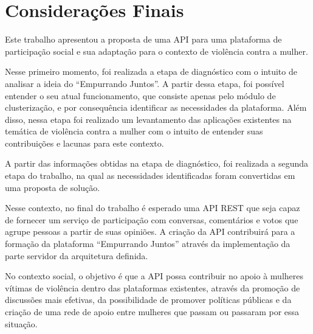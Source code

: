 \chapter{Considerações Finais} \label{cap:consideracoes_finais}

Este trabalho apresentou a proposta de uma API para uma plataforma de
participação social e sua adaptação para o contexto de violência contra a mulher.

Nesse primeiro momento, foi realizada a etapa de diagnóstico com o intuito de 
analisar a ideia do ``Empurrando Juntos''. A partir dessa etapa, foi possível entender
o seu atual funcionamento, que consiste apenas pelo módulo de clusterização, e por consequência identificar as necessidades da plataforma.
Além disso, nessa etapa foi realizado um levantamento das aplicações existentes na temática de violência contra a mulher com o intuito de 
entender suas contribuições e lacunas para este contexto.

A partir das informações obtidas na etapa de diagnóstico, foi realizada a segunda etapa do trabalho, na qual as necessidades identificadas
foram convertidas em uma proposta de solução.

Nesse contexto, no final do trabalho é esperado uma API REST que seja capaz de fornecer um serviço de participação com conversas, comentários
e votos que agrupe pessoas a partir de suas opiniões. A criação da API contribuirá para a formação da plataforma ``Empurrando Juntos'' 
através da implementação da parte servidor da arquitetura definida.

No contexto social, o objetivo é que a API possa contribuir no apoio à mulheres vítimas de violência dentro das plataformas existentes, através
da promoção de discussões mais efetivas, da possibilidade de promover políticas públicas e da criação de uma rede de apoio entre mulheres que passam ou passaram por essa situação.
